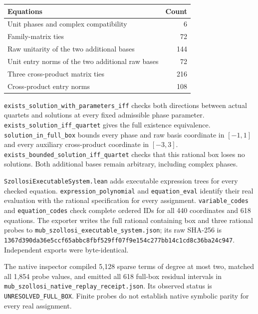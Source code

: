\documentclass[
]{article}
\begin{document}
\begin{longtable}[]{@{}lr@{}}
\toprule\noalign{}
Equations & Count \\
\midrule\noalign{}
\endhead
\bottomrule\noalign{}
\endlastfoot
Unit phases and complex compatibility & 6 \\
Family-matrix ties & 72 \\
Raw unitarity of the two additional bases & 144 \\
Unit entry norms of the two additional raw bases & 72 \\
Three cross-product matrix ties & 216 \\
Cross-product entry norms & 108 \\
\end{longtable}

\nolinkurl{exists_solution_with_parameters_iff} checks both directions
between actual quartets and solutions at every fixed admissible phase
parameter. \nolinkurl{exists_solution_iff_quartet} gives the full
existence equivalence. \nolinkurl{solution_in_full_box} bounds every
phase and raw basis coordinate in \([-1,1]\) and every auxiliary
cross-product coordinate in \([-3,3]\).
\nolinkurl{exists_bounded_solution_iff_quartet} checks that this
rational box loses no solutions. Both additional bases remain arbitrary,
including complex phases.

\nolinkurl{SzollosiExecutableSystem.lean} adds executable expression
trees for every checked equation. \nolinkurl{expression_polynomial} and
\nolinkurl{equation_eval} identify their real evaluation with the
rational specification for every assignment. \nolinkurl{variable_codes}
and \nolinkurl{equation_codes} check complete ordered IDs for all 440
coordinates and 618 equations. The exporter writes the full rational
containing box and three rational probes to
\nolinkurl{mub_szollosi_executable_system.json}; its raw SHA-256 is
\nolinkurl{1367d390da36e5ccf65abbc8fbf529ff07f9e154c277bb14c1cd8c36ba24c947}.
Independent exports were byte-identical.

The native inspector compiled 5,128 sparse terms of degree at most two,
matched all 1,854 probe values, and emitted all 618 full-box residual
intervals in \nolinkurl{mub_szollosi_native_replay_receipt.json}. Its
observed status is \nolinkurl{UNRESOLVED_FULL_BOX}. Finite probes do not
establish native symbolic parity for every real assignment.
\end{document}
